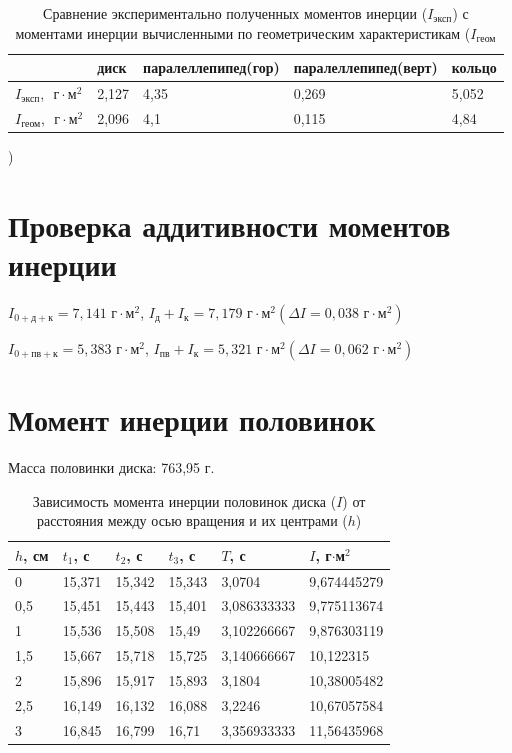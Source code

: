 \documentclass[a4paper, 12pt]{article}
\begin{document}
\begin{table}[!ht]
    \centering
    \begin{tabular}{|l|l|l|l|l|}
    \hline
         & диск & паралеллепипед(гор) & паралеллепипед(верт) & кольцо \\ \hline
        $I_\text{эксп}$, $\text{ г}\cdot\text{м}^2$ & 2,127 & 4,35 & 0,269 & 5,052 \\ \hline
        $I_\text{геом}$, $\text{ г}\cdot\text{м}^2$ & 2,096 & 4,1 & 0,115 & 4,84 \\ \hline
    \end{tabular}
    \caption{Сравнение экспериментально полученных моментов инерции ($I_\text{эксп}$) с моментами инерции вычисленными по геометрическим характеристикам ($I_\text{геом}$})
\end{table}

\section*{Проверка аддитивности моментов инерции}

$I_{0+\text{д}+\text{к}} = 7,141 \text{ г}\cdot\text{м}^2$, $I_\text{д}+I_\text{к} = 7,179 \text{ г}\cdot\text{м}^2 (\Delta I = 0,038 \text{ г}\cdot\text{м}^2)$

$I_{0+\text{пв}+\text{к}} = 5,383 \text{ г}\cdot\text{м}^2$, $I_\text{пв}+I_\text{к} = 5,321 \text{ г}\cdot\text{м}^2 (\Delta I = 0,062 \text{ г}\cdot\text{м}^2)$

\section*{Момент инерции половинок}

Масса половинки диска: 763,95 г.

\begin{table}[!ht]
    \centering
    \begin{tabular}{|l|l|l|l|l|l|}
    \hline
        $h$, см & $t_1$, с & $t_2$, с & $t_3$, с & $T$, с & $I$, г$\cdot$м$^2$ \\ \hline
        0 & 15,371 & 15,342 & 15,343 & 3,0704 & 9,674445279 \\ \hline
        0,5 & 15,451 & 15,443 & 15,401 & 3,086333333 & 9,775113674 \\ \hline
        1 & 15,536 & 15,508 & 15,49 & 3,102266667 & 9,876303119 \\ \hline
        1,5 & 15,667 & 15,718 & 15,725 & 3,140666667 & 10,122315 \\ \hline
        2 & 15,896 & 15,917 & 15,893 & 3,1804 & 10,38005482 \\ \hline
        2,5 & 16,149 & 16,132 & 16,088 & 3,2246 & 10,67057584 \\ \hline
        3 & 16,845 & 16,799 & 16,71 & 3,356933333 & 11,56435968 \\ \hline
    \end{tabular}
    \caption{Зависимость момента инерции половинок диска ($I$) от расстояния между осью вращения и их центрами ($h$)}
\end{table}
\end{document}
